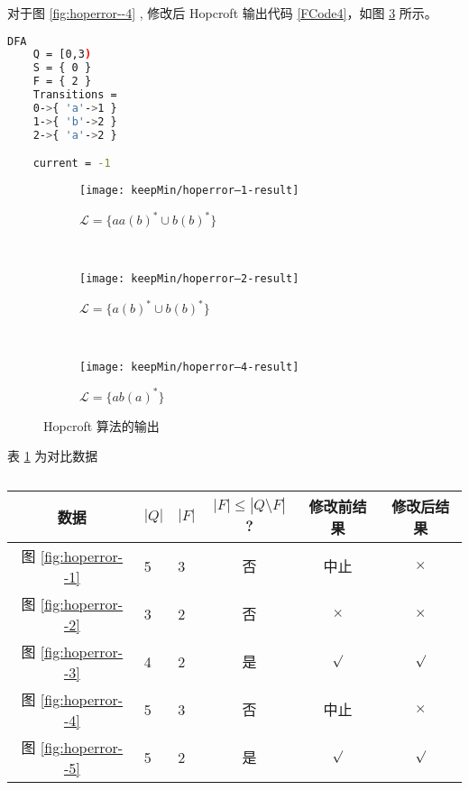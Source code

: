 对于图 \ref{fig:hoperror--4} , 修改后 Hopcroft 输出代码 \ref{FCode4}，如图 \ref{fig:hoperror--4-result} 所示。
\begin{lstlisting}[language=bash,label={FCode4},caption={图 \ref{fig:hoperror--4} 输出}]
    DFA
    Q = [0,3)
    S = { 0 }
    F = { 2 }
    Transitions =
    0->{ 'a'->1 }
    1->{ 'b'->2 }
    2->{ 'a'->2 }

    current = -1
\end{lstlisting}


\begin{figure}[!htbp]
    \centering
    \begin{subfigure}[b]{0.7\textwidth}
        \texttt{[image: keepMin/hoperror--1-result]}
        \caption{$\mathcal{L}=\{aa(b)^* \cup b(b)^*\}$}
        \label{fig:hoperror--1-result}
    \end{subfigure}
    \\
    \begin{subfigure}[b]{0.7\textwidth}
        \texttt{[image: keepMin/hoperror--2-result]}
        \caption{$\mathcal{L}=\{a(b)^* \cup b(b)^*\}$}
        \label{fig:hoperror--2-result}
    \end{subfigure}
    \\
    \begin{subfigure}[b]{0.7\textwidth}
        \texttt{[image: keepMin/hoperror--4-result]}
        \caption{$\mathcal{L}=\{ab(a)^*\}$}
        \label{fig:hoperror--4-result}
    \end{subfigure}
    \caption{Hopcroft 算法的输出 }
    \label{fig:hopcerror-result}
  \end{figure}

  表 \ref{tab:KeepMinResultofAll-hop} 为对比数据

  \begin{table}[!htbp]
    \caption{  }
    \label{tab:KeepMinResultofAll-hop}
    \centering
    \small%
    \setlength{\tabcolsep}{4pt}%
    \renewcommand{\arraystretch}{1.2}%
    \begin{tabular}{c p{2em}<{\centering}p{2em}<{\centering}ccc }  %
        \toprule %
        数据 & $|Q|$ & $|F|$ & $|F|\leq |Q \setminus F|$? & 修改前结果 &  修改后结果  \\
        \midrule
        图 \ref{fig:hoperror--1}        & 5 & 3 & 否 & 中止       & $\times$        \\
        图 \ref{fig:hoperror--2}        & 3 & 2 & 否 & $\times$   & $\times$       \\
        图 \ref{fig:hoperror--3}        & 4 & 2 & 是 & $\surd$    & $\surd$       \\
        图 \ref{fig:hoperror--4}        & 5 & 3 & 否 & 中止       & $\times$       \\
        图 \ref{fig:hoperror--5}        & 5 & 2 & 是 & $\surd$    & $\surd$       \\
        \bottomrule%
    \end{tabular}
\end{table}


